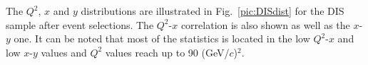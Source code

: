 The $Q^2$, $x$ and $y$ distributions are illustrated in Fig.~\ref{pic:DISdist} for the DIS sample after event selections. The $Q^2$-$x$ correlation is also shown as well as the $x$-$y$ one. It can be noted that most of the statistics is located in the low $Q^2$-$x$ and low $x$-$y$ values and $Q^2$ values reach up to 90 (GeV/$c$)$^2$.

\begin{figure}[!h]
   \\

\end{figure}
